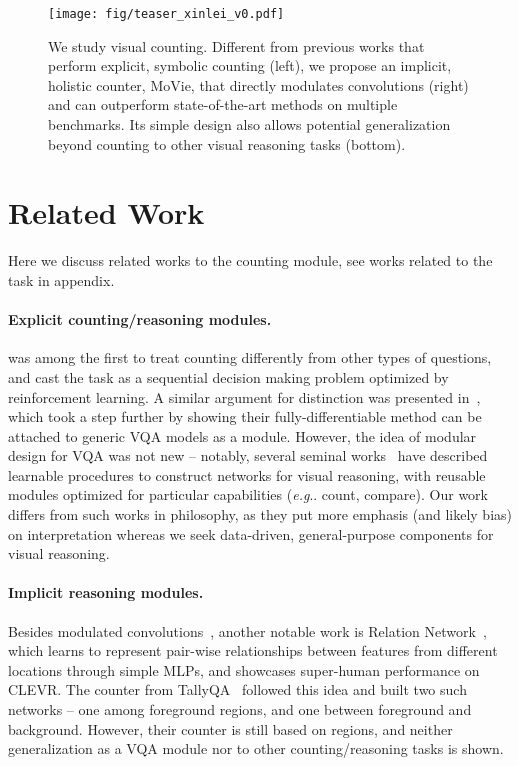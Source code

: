 \documentclass{article} \usepackage[dvipsnames,table]{xcolor}
\makeatletter
\newcommand{\ours}[0]{MoVie\xspace}
\DeclareRobustCommand\onedot{\futurelet\@let@token\@onedot}
\def\@onedot{\ifx\@let@token.\else.\null\fi\xspace}
\def\eg{\emph{e.g}\onedot} \def\Eg{\emph{E.g}\onedot}
\makeatother
\begin{document}
\begin{figure}[t]
\centering
\texttt{[image: fig/teaser\_xinlei\_v0.pdf]}
\caption{\label{fig:teaser} We study visual counting. Different from previous works that perform explicit, symbolic counting (left), we propose an implicit, holistic counter, \ours, that directly modulates convolutions (right) and can outperform state-of-the-art methods on multiple benchmarks. Its simple design also allows potential generalization beyond counting to other visual reasoning tasks (bottom).}
\end{figure}


\section{Related Work\label{sec:related}}

Here we discuss related works to the counting module, see works related to the task in appendix.

\paragraph{Explicit counting/reasoning modules.} \cite{trott2018interpretable} was among the first to treat counting differently from other types of questions, and cast the task as a sequential decision making problem optimized by reinforcement learning. A similar argument for distinction was presented in~\cite{zhang2018learning}, which took a step further by showing their fully-differentiable method can be attached to generic VQA models as a module. However, the idea of modular design for VQA was not new -- notably, several seminal works~\cite{andreas2016neural,hu2017learning} have described learnable procedures to construct networks for visual reasoning, with reusable modules optimized for particular capabilities (\eg count, compare). Our work differs from such works in philosophy, as they put more emphasis (and likely bias) on interpretation whereas we seek data-driven, general-purpose components for visual reasoning.

\paragraph{Implicit reasoning modules.} Besides modulated convolutions~\cite{perez2018film,de2017modulating}, another notable work is Relation Network~\cite{santoro2017simple}, which learns to represent pair-wise relationships between features from different locations through simple MLPs, and showcases super-human performance on CLEVR. The counter from TallyQA~\cite{acharya2019tallyqa} followed this idea and built two such networks -- one among foreground regions, and one between foreground and background. However, their counter is still based on regions, and neither generalization as a VQA module nor to other counting/reasoning tasks is shown.
\end{document}
